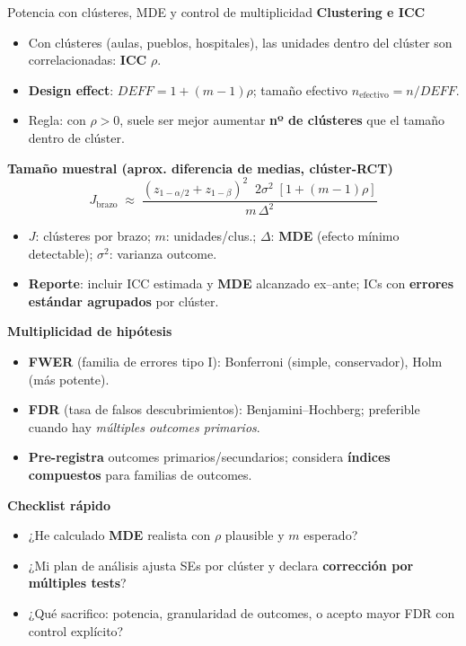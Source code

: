 ﻿\documentclass{beamer}
\begin{document}
\begin{frame}{Potencia con clústeres, MDE y control de multiplicidad}
\small
\textbf{Clustering e ICC}
\begin{itemize}
  \item Con clústeres (aulas, pueblos, hospitales), las unidades dentro del clúster son correlacionadas: \textbf{ICC} $\rho$.
  \item \textbf{Design effect}: $DEFF = 1 + (m-1)\rho$; tamaño efectivo $n_{\text{efectivo}}=n/DEFF$.
  \item Regla: con $\rho>0$, suele ser mejor aumentar \textbf{nº de clústeres} que el tamaño dentro de clúster.
\end{itemize}

\textbf{Tamaño muestral (aprox. diferencia de medias, clúster-RCT)}
\[
J_{\text{brazo}} \;\approx\; 
\frac{(z_{1-\alpha/2}+z_{1-\beta})^2 \;\; 2\sigma^2 \; [1+(m-1)\rho]}{m\,\Delta^2}
\]
\begin{itemize}
  \item $J$: clústeres por brazo; $m$: unidades/clus.; $\Delta$: \textbf{MDE} (efecto mínimo detectable); $\sigma^2$: varianza outcome.
  \item \textbf{Reporte}: incluir ICC estimada y \textbf{MDE} alcanzado ex–ante; ICs con \textbf{errores estándar agrupados} por clúster.
\end{itemize}

\textbf{Multiplicidad de hipótesis}
\begin{itemize}
  \item \textbf{FWER} (familia de errores tipo I): Bonferroni (simple, conservador), Holm (más potente).
  \item \textbf{FDR} (tasa de falsos descubrimientos): Benjamini--Hochberg; preferible cuando hay \textit{múltiples outcomes primarios}.
  \item \textbf{Pre-registra} outcomes primarios/secundarios; considera \textbf{índices compuestos} para familias de outcomes.
\end{itemize}

\textbf{Checklist rápido}
\begin{itemize}
  \item ¿He calculado \textbf{MDE} realista con $\rho$ plausible y $m$ esperado?
  \item ¿Mi plan de análisis ajusta SEs por clúster y declara \textbf{corrección por múltiples tests}?
  \item ¿Qué sacrifico: potencia, granularidad de outcomes, o acepto mayor FDR con control explícito?
\end{itemize}
\end{frame}
\end{document}
